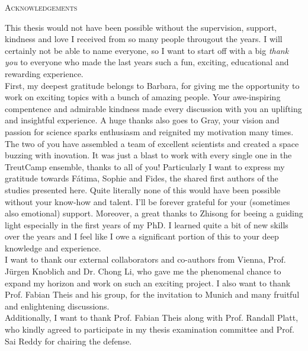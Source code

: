 \begin{center}
    \large\textsc{Acknowledgements}
\end{center}

This thesis would not have been possible without the supervision, support, kindness and love I received from so many people througout the years. I will certainly not be able to name everyone, so I want to start off with a big \textit{thank you} to everyone who made the last years such a fun, exciting, educational and rewarding experience. \\

First, my deepest gratitude belongs to Barbara, for giving me the opportunity to work on exciting topics with a bunch of amazing people. Your awe-inspiring compentence and admirable kindness made every discussion with you an uplifting and insightful experience. A huge thanks also goes to Gray, your vision and passion for science sparks enthusiasm and reignited my motivation many times. The two of you have assembled a team of excellent scientists and created a space buzzing with inovation. It was just a blast to work with every single one in the TreutCamp ensemble, thanks to all of you! Particularly I want to express my gratitude towards Fátima, Sophie and Fides, the shared first authors of the studies presented here. Quite literally none of this would have been possible without your know-how and talent. I'll be forever grateful for your (sometimes also emotional) support. Moreover, a great thanks to Zhisong for beeing a guiding light especially in the first years of my PhD. I learned quite a bit of new skills over the years and I feel like I owe a significant portion of this to your deep knowledge and experience. \\

I want to thank our external collaborators and co-authors from Vienna, Prof. Jürgen Knoblich and Dr. Chong Li, who gave me the phenomenal chance to expand my horizon and work on such an exciting project. I also want to thank Prof. Fabian Theis and his group, for the invitation to Munich and many fruitful and enlightening discussions. \\

Additionally, I want to thank Prof. Fabian Theis along with Prof. Randall Platt, who kindly agreed to participate in my thesis examination committee and Prof. Sai Reddy for chairing the defense. \\

